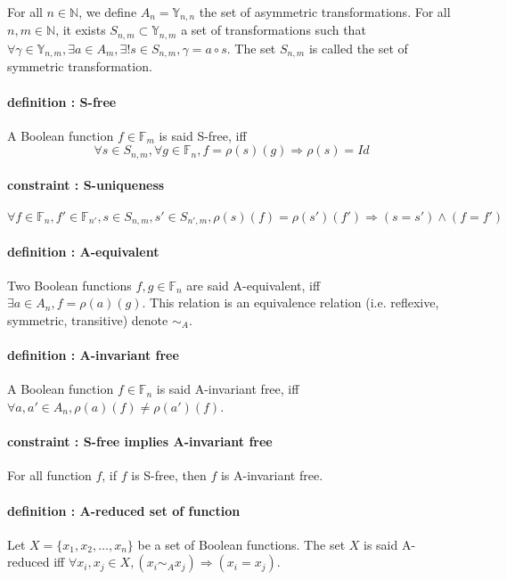 \documentclass[a4paper,10pt]{article}
\newcommand{\N}{\mathbb{N}}%
\newcommand{\F}{\mathbb{F}}%
\newcommand{\Y}{\mathbb{Y}}%
\begin{document}
For all $n\in\N$, we define $A_n = \Y_{n, n}$ the set of asymmetric transformations.
For all $n, m\in\N$, it exists $S_{n, m} \subset \Y_{n, m}$ a set of transformations such that $\forall \gamma \in \Y_{n, m}, \exists a \in A_m, \exists! s \in S_{n, m},  \gamma = a \circ s$.
The set $S_{n, m}$ is called the set of symmetric transformation.

\paragraph{definition : S-free\\}
A Boolean function $f\in\F_m$ is said S-free, iff
\[\forall s \in S_{n, m}, \forall g \in \F_n, f = \rho(s)(g) \Rightarrow \rho(s) = Id\]

\paragraph{constraint : S-uniqueness\\}
\[\forall f\in\F_n, f'\in\F_{n'}, s\in S_{n, m}, s'\in S_{n', m}, \rho(s)(f) = \rho(s')(f') \Rightarrow (s = s') \land (f = f')\]

\paragraph{definition : A-equivalent\\}
Two Boolean functions $f, g\in\F_n$ are said A-equivalent, iff $\exists a\in A_n, f = \rho(a)(g)$.
This relation is an equivalence relation (i.e. reflexive, symmetric, transitive) denote $\sim_A$.

\paragraph{definition : A-invariant free\\}
A Boolean function $f\in\F_n$ is said A-invariant free, iff $\forall a, a'\in A_n, \rho(a)(f) \neq \rho(a')(f)$.

\paragraph{constraint : S-free implies A-invariant free\\}
For all function $f$, if $f$ is S-free, then $f$ is A-invariant free.

\paragraph{definition : A-reduced set of function\\}
Let $X = \{x_1, x_2, \dots, x_n\}$ be a set of Boolean functions.
The set $X$ is said A-reduced iff $\forall x_i, x_j \in X, (x_i \sim_A x_j) \Rightarrow (x_i = x_j)$.
\end{document}
